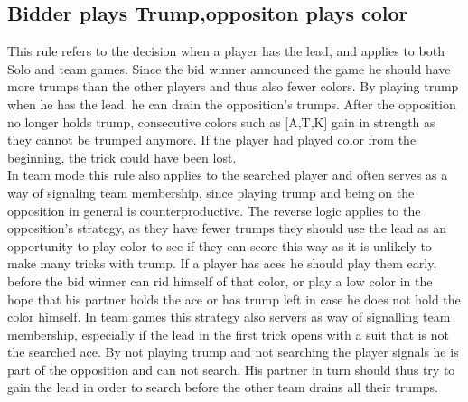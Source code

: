 \subsection{Bidder plays Trump,oppositon plays color}
This rule refers to the decision when a player has the lead, and applies to both Solo and team games.
Since the bid winner announced the game he should have more trumps than the other players and thus also fewer colors.
By playing trump when he has the lead, he can drain the opposition's trumps.
After the opposition no longer holds trump, consecutive colors such as [A,T,K] gain in strength as they cannot be
trumped anymore.
If the player had played color from the beginning, the trick could have been lost.\\
In team mode this rule also applies to the searched player and often serves as a way of signaling team membership,
since playing trump and being on the opposition in general is counterproductive.
\newline
The reverse logic applies to the opposition's strategy, as they have fewer trumps they should use the lead as an
opportunity to play color to see if they can score this way as it is unlikely to make many tricks
with trump.
If a player has aces he should play them early, before the bid winner can rid himself of that color, or play a low
color in the hope that his partner holds the ace or has trump left in case he does not hold the color himself.
\newline
In team games this strategy also servers as way of signalling team membership, especially if the lead in the first
trick opens with a suit that is not the searched ace.
By not playing trump and not searching the player signals he is part of the opposition and can not search.
His partner in turn should thus try to gain the lead in order to search before the other team drains all their trumps.

\subsection{}


